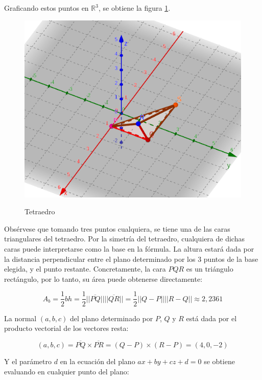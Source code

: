 \documentclass{article}
\renewcommand{\Bbb}{\mathbb}
\begin{document}
\begin{enumerate}[(a)]
Graficando estos puntos en $\Bbb R^3$, se obtiene la figura \ref{fig:1-8-c}.

\begin{figure}[ht]
\caption{Tetraedro}
\includegraphics[scale=0.6]{img/ejercicios/1/8-c.png} 
\centering
\label{fig:1-8-c}
\end{figure}

Obsérvese que tomando tres puntos cualquiera, se tiene una de las caras triangulares del tetraedro. Por la simetría del tetraedro, cualquiera de dichas caras puede interpretarse como la base en la fórmula. La altura estará dada por la distancia perpendicular entre el plano determinado por los 3 puntos de la base elegida, y el punto restante. Concretamente, la cara $PQR$ es un triángulo rectángulo, por lo tanto, su área puede obtenerse directamente:

\begin{equation}
A_b = \frac{1}{2} b h = \frac{1}{2} ||\overline{PQ}|| ||\overline{QR}|| = \frac{1}{2} ||Q-P|| ||R-Q|| \approx 2,2361
\end{equation}

La normal $(a,b,c)$ del plano determinado por $P$, $Q$ y $R$ está dada por el producto vectorial de los vectores resta:

\begin{equation}
(a,b,c) = \overline{PQ} \times \overline{PR} = (Q-P) \times (R-P) = (4, 0, -2)
\end{equation}

Y el parámetro $d$ en la ecuación del plano $a x + b y + c z + d = 0$ se obtiene evaluando en cualquier punto del plano:


\end{enumerate}
\end{document}

